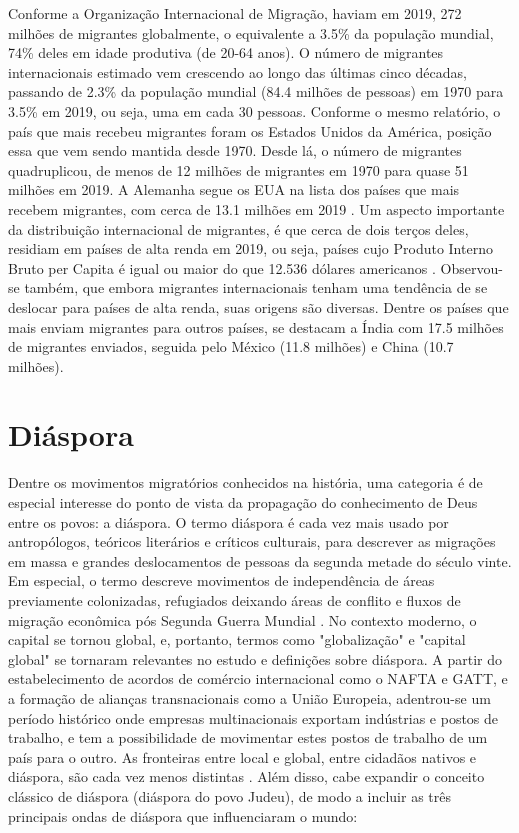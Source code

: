 \documentclass[12pt,openright,oneside,a4paper]{abntex2}
\begin{document}
Conforme a Organização Internacional de Migração, haviam em 2019, 272 milhões de migrantes globalmente, o equivalente a 3.5\% da população mundial, 74\% deles em idade produtiva (de 20-64 anos). O número de migrantes internacionais estimado vem crescendo ao longo das últimas cinco décadas, passando de 2.3\% da população mundial (84.4 milhões de pessoas) em 1970 para 3.5\% em 2019, ou seja, uma em cada 30 pessoas. Conforme o mesmo relatório, o país que mais recebeu migrantes foram os Estados Unidos da América, posição essa que vem sendo mantida desde 1970. Desde lá, o número de migrantes quadruplicou, de menos de 12 milhões de migrantes em 1970 para quase 51 milhões em 2019. A Alemanha segue os EUA na lista dos países que mais recebem migrantes, com cerca de 13.1 milhões em 2019 \cite[p. 21]{iom2020}. Um aspecto importante da distribuição internacional de migrantes, é que cerca de dois terços deles, residiam em países de alta renda em 2019, ou seja, países cujo Produto Interno Bruto per Capita é igual ou maior do que 12.536 dólares americanos \cite{world_bank_country_lending_groups}. Observou-se também, que embora migrantes internacionais tenham uma tendência de se deslocar para países de alta renda, suas origens são diversas.  Dentre os países que mais enviam migrantes para outros países, se destacam a Índia com 17.5 milhões de migrantes enviados, seguida pelo México (11.8 milhões) e China (10.7 milhões). 

\section{Diáspora}

Dentre os movimentos migratórios conhecidos na história, uma categoria é de especial interesse do ponto de vista da propagação do conhecimento de Deus entre os povos: a diáspora. O termo diáspora é cada vez mais usado por antropólogos, teóricos literários e críticos culturais, para descrever as migrações em massa e grandes deslocamentos de pessoas da segunda metade do século vinte. Em especial, o termo descreve movimentos de independência de áreas previamente colonizadas, refugiados deixando áreas de conflito e fluxos de migração econômica pós Segunda Guerra Mundial \cite[p. 11]{braziel}. No contexto moderno, o capital se tornou global, e, portanto, termos como "globalização" e "capital global" se tornaram relevantes no estudo e definições sobre diáspora. A partir do estabelecimento de acordos de comércio internacional como o NAFTA e GATT, e a formação de alianças transnacionais como a União Europeia, adentrou-se um período histórico onde empresas multinacionais exportam indústrias e postos de trabalho, e tem a possibilidade de movimentar estes postos de trabalho de um país para o outro. As fronteiras entre local e global, entre cidadãos nativos e diáspora, são cada vez menos distintas \cite[p. 19]{braziel}. Além disso, cabe expandir o conceito clássico de diáspora (diáspora do povo Judeu), de modo a incluir as três principais ondas de diáspora que influenciaram o mundo: 
\end{document}
